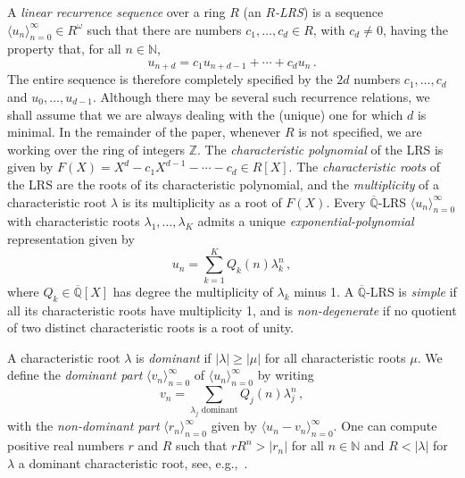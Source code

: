 \documentclass[a4paper,UKenglish,cleveref, autoref, thm-restate]{lipics-v2021}
\newcommand{\nat} {\mathbb{N}}
\newcommand{\rat} {\mathbb{Q}}
\newcommand{\alg} {\overline{\mathbb{Q}}}
\begin{document}
A \emph{linear recurrence sequence} over a ring $R$ (an
\emph{$R$-LRS}) is a sequence
$\langle u_n\rangle_{n=0}^\infty \in R^\omega$ such that there are
numbers $c_1,\dots,c_d \in R$, with $c_d \ne 0$, having the property that, for all $n \in \nat$,
\begin{equation*}
    u_{n+d} = c_1u_{n+d-1} + \cdots + c_du_n \, .
\end{equation*}
The entire sequence is therefore completely specified by the $2d$
numbers $c_1,\dots,c_d$ and $u_0,\dots,u_{d-1}$. Although there may
be several such recurrence relations, we shall assume that we are
always dealing with the (unique) one for which $d$ is minimal.
In the remainder of the paper, whenever $R$ is not specified,
we are working over the ring of integers $\mathbb{Z}$.
The \emph{characteristic polynomial} of the LRS is given by
$F(X) = X^d - c_1X^{d-1} - \cdots - c_d \in R[X]$.  The
\emph{characteristic roots} of the LRS are the roots of its
characteristic polynomial, and the \emph{multiplicity} of a
characteristic root $\lambda$ is its multiplicity as a root of $F(X)$.
Every $\alg$-LRS $\langle u_n \rangle_{n=0}^\infty$ with
characteristic roots $\lambda_1,\dots,\lambda_K$ admits a unique
\emph{exponential-polynomial} representation given by
\begin{equation*}
    u_n = \sum_{k=1}^K Q_k(n)\lambda_k^n \, ,
\end{equation*}
where $Q_k \in \overline{\rat}[X]$ has degree the multiplicity of $\lambda_k$ minus 1.
A $\alg$-LRS is \emph{simple} if all its characteristic roots have
multiplicity 1, and is \emph{non-degenerate} if no quotient of two
distinct characteristic roots is a root of unity.

A characteristic root $\lambda$ is \emph{dominant} if $|\lambda| \ge |\mu|$ for all characteristic roots $\mu$.
We define the \emph{dominant part} $\langle v_n\rangle_{n=0}^\infty$ of $\langle
u_n\rangle_{n=0}^\infty$ by writing
\begin{equation*}
    v_n = \sum_{\text{$\lambda_j$ dominant}} Q_j(n)\lambda_j^n \, ,
\end{equation*}
with the \emph{non-dominant part} $\langle r_n \rangle_{n=0}^\infty$
given by $\langle u_n - v_n\rangle_{n=0}^\infty$.
One can compute positive real numbers $r$ and $R$ such that $rR^n >
|r_n|$ for all $n \in \nat$ and $R < |\lambda|$ for $\lambda$ a
dominant characteristic root, see, e.g.,~\cite[Lem.~2.5]{berthe2024decidability}.
\end{document}
